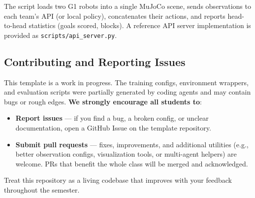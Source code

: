 \documentclass{article}
\begin{document}
The script loads two G1 robots into a single MuJoCo scene, sends observations to each team's API (or local policy), concatenates their actions, and reports head-to-head statistics (goals scored, blocks). A reference API server implementation is provided as \texttt{scripts/api\_server.py}.

\subsection{Contributing and Reporting Issues}

This template is a work in progress. The training configs, environment wrappers, and evaluation scripts were partially generated by coding agents and may contain bugs or rough edges. \textbf{We strongly encourage all students to}:
\begin{itemize}
    \item \textbf{Report issues} --- if you find a bug, a broken config, or unclear documentation, open a GitHub Issue on the template repository.
    \item \textbf{Submit pull requests} --- fixes, improvements, and additional utilities (e.g., better observation configs, visualization tools, or multi-agent helpers) are welcome. PRs that benefit the whole class will be merged and acknowledged.
\end{itemize}

Treat this repository as a living codebase that improves with your feedback throughout the semester.

{


}
\end{document}
